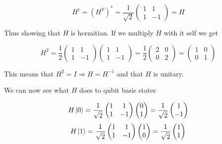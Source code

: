 \documentclass[a4paper,norsk, 10pt]{article}
\begin{document}
\begin{equation}
H^\dagger = (H^T)^* = 
\frac{1}{\sqrt{2}}
\begin{pmatrix}
1 & 1 \\
1 & -1
\end{pmatrix}
= H
\end{equation}

Thus showing that $H$ is hermitian. If we multiply $H$ with it self we get

\begin{equation}
H^2 = \frac{1}{2}
\begin{pmatrix}
1 & 1 \\
1 & -1
\end{pmatrix}
\begin{pmatrix}
1 & 1 \\
1 & -1
\end{pmatrix}
=\frac{1}{2}
\begin{pmatrix}
2 & 0 \\
0 & 2
\end{pmatrix}
=
\begin{pmatrix}
1 & 0 \\
0 & 1
\end{pmatrix}
\end{equation}

This means that $H^2 = I \Rightarrow H = H^{-1}$ and that $H$ is unitary.

We can now see what $H$ does to qubit basis states

\begin{equation}
H\ket{0} = 
\frac{1}{\sqrt{2}}
\begin{pmatrix}
1 & 1 \\
1 & -1
\end{pmatrix}
\begin{pmatrix}
0 \\1
\end{pmatrix}
= \frac{1}{\sqrt{2}}
\begin{pmatrix}
1 \\ -1
\end{pmatrix}
\end{equation}
\begin{equation}
H\ket{1} = 
\frac{1}{\sqrt{2}}
\begin{pmatrix}
1 & 1 \\
1 & -1
\end{pmatrix}
\begin{pmatrix}
1 \\ 0
\end{pmatrix}
= \frac{1}{\sqrt{2}}
\begin{pmatrix}
1 \\ 1
\end{pmatrix}
\end{equation}
\end{document}
